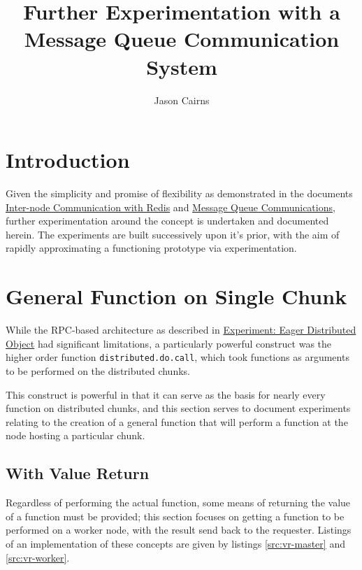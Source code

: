 \documentclass[a4paper,10pt]{article}
\begin{document}
\title{Further Experimentation with a Message Queue Communication System}
\author{Jason Cairns}
  
\maketitle{}

\section{Introduction}

Given the simplicity and promise of flexibility as demonstrated in the
documents \href{inter-node-comm-w-redis.pdf}{Inter-node Communication with
Redis} and \href{message-queues-comms.pdf}{Message Queue Communications},
further experimentation around the concept is undertaken and documented herein.
The experiments are built successively upon it's prior, with the aim of rapidly
approximating a functioning prototype via experimentation.

\section{General Function on Single Chunk}

While the RPC-based architecture as described in
\href{experiment-eager-dist-obj-pre.pdf}{Experiment: Eager Distributed Object}
had significant limitations, a particularly powerful construct was the higher
order function \texttt{distributed.do.call}, which took functions as arguments
to be performed on the distributed chunks.

This construct is powerful in that it can serve as the basis for nearly every
function on distributed chunks, and this section serves to document experiments
relating to the creation of a general function that will perform a function at
the node hosting a particular chunk.

\subsection{With Value Return}\label{sec:val-ret}

Regardless of performing the actual function, some means of returning the value
of a function must be provided; this section focuses on getting a function to
be performed on a worker node, with the result send back to the requester.
Listings of an implementation of these concepts are given by listings
\ref{src:vr-master} and \ref{src:vr-worker}.
\end{document}
